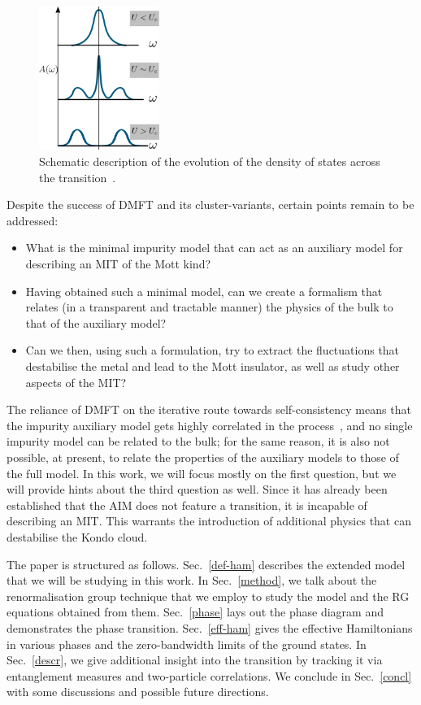 \documentclass[reprint,superscriptaddress,floatfix]{revtex4-2}
\begin{document}
\begin{figure}[!htb]
	\centering
	\includegraphics[width=0.35\textwidth]{spec_func.pdf}
	\caption{Schematic description of the evolution of the density of states across the transition~\cite{zhang_1993}.}
	\label{spec-func_scheme}
\end{figure}

Despite the success of DMFT and its cluster-variants, certain points remain to be addressed:
\begin{itemize}
	\item What is the minimal impurity model that can act as an auxiliary model for describing an MIT of the Mott kind?
	\item Having obtained such a minimal model, can we create a formalism that relates (in a transparent and tractable manner) the physics of the bulk to that of the auxiliary model?
	\item Can we then, using such a formulation, try to extract the fluctuations that destabilise the metal and lead to the Mott insulator, as well as study other aspects of the MIT?
\end{itemize}
The reliance of DMFT on the iterative route towards self-consistency means that the impurity auxiliary model gets highly correlated in the process~\cite{held2008}, and no single impurity model can be related to the bulk; for the same reason, it is also not possible, at present, to relate the properties of the auxiliary models to those of the full model. In this {\color{blue}work}, we will focus mostly on the first question, but we will provide hints about the third question as well. Since it has already been established that the AIM does not feature a transition, it is incapable of describing an MIT. This warrants the introduction of additional physics that can destabilise the Kondo cloud.

The paper is structured as follows. Sec.~\ref{def-ham} describes the extended model that we will be studying in this {\color{blue}work}. In Sec.~\ref{method}, we talk about the renormalisation group technique that we employ to study the model and the RG equations obtained from them. Sec.~\ref{phase} lays out the phase diagram and demonstrates the phase transition. Sec.~\ref{eff-ham} gives the effective Hamiltonians in various phases and the zero-bandwidth limits of the ground states. In Sec.~\ref{descr}, we give additional insight into the transition by tracking it via entanglement measures and two-particle correlations. We conclude in Sec.~\ref{concl} with some discussions and possible future directions.
\end{document}
